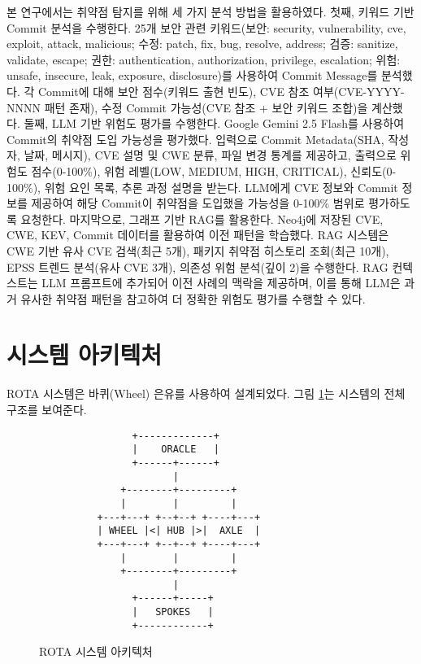 ﻿\documentclass[conference]{IEEEtran}
\begin{document}
본 연구에서는 취약점 탐지를 위해 세 가지 분석 방법을 활용하였다. 첫째, 키워드 기반 Commit 분석을 수행한다. 25개 보안 관련 키워드(보안: security, vulnerability, cve, exploit, attack, malicious; 수정: patch, fix, bug, resolve, address; 검증: sanitize, validate, escape; 권한: authentication, authorization, privilege, escalation; 위험: unsafe, insecure, leak, exposure, disclosure)를 사용하여 Commit Message를 분석했다. 각 Commit에 대해 보안 점수(키워드 출현 빈도), CVE 참조 여부(CVE-YYYY-NNNN 패턴 존재), 수정 Commit 가능성(CVE 참조 + 보안 키워드 조합)을 계산했다. 둘째, LLM 기반 위험도 평가를 수행한다. Google Gemini 2.5 Flash를 사용하여 Commit의 취약점 도입 가능성을 평가했다. 입력으로 Commit Metadata(SHA, 작성자, 날짜, 메시지), CVE 설명 및 CWE 분류, 파일 변경 통계를 제공하고, 출력으로 위험도 점수(0-100\%), 위험 레벨(LOW, MEDIUM, HIGH, CRITICAL), 신뢰도(0-100\%), 위험 요인 목록, 추론 과정 설명을 받는다. LLM에게 CVE 정보와 Commit 정보를 제공하여 해당 Commit이 취약점을 도입했을 가능성을 0-100\% 범위로 평가하도록 요청한다. 마지막으로, 그래프 기반 RAG를 활용한다. Neo4j에 저장된 CVE, CWE, KEV, Commit 데이터를 활용하여 이전 패턴을 학습했다. RAG 시스템은 CWE 기반 유사 CVE 검색(최근 5개), 패키지 취약점 히스토리 조회(최근 10개), EPSS 트렌드 분석(유사 CVE 3개), 의존성 위험 분석(깊이 2)을 수행한다. RAG 컨텍스트는 LLM 프롬프트에 추가되어 이전 사례의 맥락을 제공하며, 이를 통해 LLM은 과거 유사한 취약점 패턴을 참고하여 더 정확한 위험도 평가를 수행할 수 있다.

\section{시스템 아키텍처}

ROTA 시스템은 바퀴(Wheel) 은유를 사용하여 설계되었다. 그림 \ref{fig:architecture}는 시스템의 전체 구조를 보여준다.

\begin{figure}[h]
\centering
\small
\begin{verbatim}
                +-------------+
                |    ORACLE   |
                +------+------+
                       |
              +--------+---------+
              |        |         |
          +---+---+ +--+--+ +----+---+
          | WHEEL |<| HUB |>|  AXLE  |
          +---+---+ +--+--+ +----+---+
              |        |         |
              +--------+---------+
                       |
                +------+-----+
                |   SPOKES   |
                +------------+
\end{verbatim}
\caption{ROTA 시스템 아키텍처}
\label{fig:architecture}
\end{figure}
\end{document}
